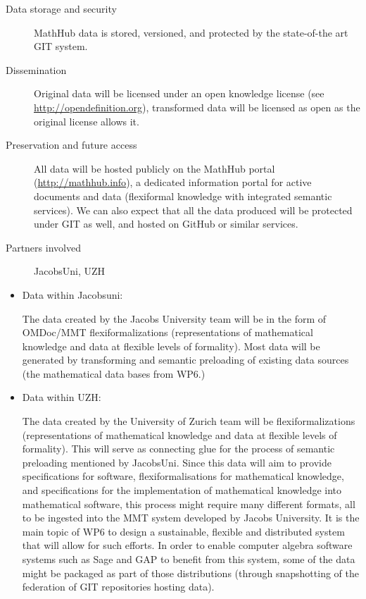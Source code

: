 \documentclass[12pt]{article}
\begin{document}
\begin{description}
\item[Data storage and security] MathHub data is stored, versioned, and protected by the
state-of-the art GIT system.
\item[Dissemination] Original data will be licensed under an open knowledge license (see
\url{http://opendefinition.org}), transformed data will be licensed as open as the
original license allows it.
\item[Preservation and future access] All data will be hosted publicly on the MathHub portal (\url{http://mathhub.info}), a
dedicated information portal for active documents and data (flexiformal knowledge with
integrated semantic services). We can also expect that all the data produced will be protected under GIT as well, and hosted on GitHub or similar services. 
\item[Partners involved] JacobsUni, UZH
\end{description}

\begin{itemize}
\item{Data within Jacobsuni:}


The data created by the Jacobs University team will be in the form of OMDoc/MMT
flexiformalizations (representations of mathematical knowledge and data at flexible levels
of formality). Most data will be generated by transforming and semantic preloading of
existing data sources (the mathematical data bases from WP6.)

\item{Data within UZH:}


The data created by the University of Zurich team will be flexiformalizations (representations of mathematical knowledge and data at flexible levels of formality). 
This will serve as connecting glue for the process of semantic preloading mentioned by JacobsUni. 
Since this data will aim to provide specifications for software, flexiformalisations for mathematical knowledge, and specifications for the implementation of mathematical knowledge into mathematical software, this process might require many different formats, all to be ingested into the MMT system developed by Jacobs University. 
It is the main topic of WP6 to design a sustainable, flexible and distributed system that will allow for such efforts.
In order to enable computer algebra software systems such as Sage and GAP to benefit from this system, some of the data might be packaged as part of those distributions (through snapshotting of the federation of GIT repositories hosting data).

\end{itemize}
\end{document}
